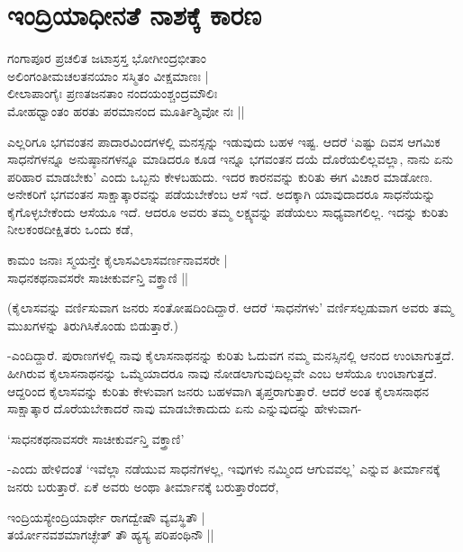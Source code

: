 \chapter{ಇಂದ್ರಿಯಾಧೀನತೆ ನಾಶಕ್ಕೆ ಕಾರಣ}\label{chap10}

\begin{shloka}
ಗಂಗಾಪೂರ ಪ್ರಚಲಿತ ಜಟಾಸ್ರಸ್ತ ಭೋಗೀಂದ್ರಭೀತಾಂ\\
ಅಲಿಂಗಂತೀಮಚಲತನಯಾಂ ಸಸ್ಮಿತಂ ವೀಕ್ಷಮಾಣಃ |\\
ಲೀಲಾಪಾಂಗೈಃ ಪ್ರಣತಜನತಾಂ ನಂದಯಂಶ್ಚಂದ್ರಮೌಲಿಃ\\
ಮೋಹಧ್ವಾಂತಂ ಹರತು ಪರಮಾನಂದ ಮೂರ್ತಿಶ್ಶಿವೋ ನಃ ||
\end{shloka}

ಎಲ್ಲರಿಗೂ ಭಗವಂತನ ಪಾದಾರವಿಂದಗಳಲ್ಲಿ ಮನಸ್ಸನ್ನು ಇಡುವುದು ಬಹಳ ಇಷ್ಟ. ಆದರೆ `ಎಷ್ಟು ದಿವಸ ಆಗಮಿಕ ಸಾಧನೆಗಳನ್ನೂ ಅನುಷ್ಠಾನಗಳನ್ನೂ ಮಾಡಿದರೂ ಕೂಡ ಇನ್ನೂ ಭಗವಂತನ ದಯೆ ದೊರೆಯಲಿಲ್ಲವಲ್ಲಾ, ನಾನು ಏನು ಪರಿಹಾರ ಮಾಡಬೇಕು' ಎಂದು ಒಬ್ಬನು ಕೇಳಬಹುದು. ಇದರ ಕಾರನವನ್ನು ಕುರಿತು ಈಗ ವಿಚಾರ ಮಾಡೋಣ. ಅನೇಕರಿಗೆ ಭಗವಂತನ ಸಾಕ್ಷಾತ್ಕಾರವನ್ನು ಪಡೆಯಬೇಕೆಂಬ ಆಸೆ ಇದೆ. ಅದಕ್ಕಾಗಿ ಯಾವುದಾದರೂ ಸಾಧನೆಯನ್ನು ಕೈಗೊಳ್ಳಬೇಕೆಂದು ಆಸೆಯೂ ಇದೆ. ಆದರೂ ಅವರು ತಮ್ಮ ಲಕ್ಷ್ಯವನ್ನು ಪಡೆಯಲು ಸಾಧ್ಯವಾಗಲಿಲ್ಲ. ಇದನ್ನು ಕುರಿತು ನೀಲಕಂಠದೀಕ್ಷಿತರು ಒಂದು ಕಡೆ,

\begin{shloka}
ಕಾಮಂ ಜನಾಃ ಸ್ಮಯನ್ತೇ ಕೈಲಾಸವಿಲಾಸವರ್ಣನಾವಸರೇ |\\
ಸಾಧನಕಥನಾವಸರೇ ಸಾಚೀಕುರ್ವನ್ತಿ ವಕ್ತ್ರಾಣಿ ||
\end{shloka}

(ಕೈಲಾಸವನ್ನು ವರ್ಣಿಸುವಾಗ ಜನರು ಸಂತೋಷದಿಂದಿದ್ದಾರೆ. ಆದರೆ `ಸಾಧನೆಗಳು' ವರ್ಣಿಸಲ್ಪಡುವಾಗ ಅವರು ತಮ್ಮ ಮುಖಗಳನ್ನು ತಿರುಗಿಸಿಕೊಂಡು ಬಿಡುತ್ತಾರೆ.)

-ಎಂದಿದ್ದಾರೆ. ಪುರಾಣಗಳಲ್ಲಿ ನಾವು ಕೈಲಾಸನಾಥನನ್ನು ಕುರಿತು ಓದುವಗ ನಮ್ಮ ಮನಸ್ಸಿನಲ್ಲಿ ಆನಂದ ಉಂಟಾಗುತ್ತದೆ. ಹೀಗಿರುವ ಕೈಲಾಸನಾಥನನ್ನು ಒಮ್ಮೆಯಾದರೂ ನಾವು ನೋಡಲಾಗುವುದಿಲ್ಲವೇ ಎಂಬ ಆಸೆಯೂ ಉಂಟಾಗುತ್ತದೆ. ಆದ್ದರಿಂದ ಕೈಲಾಸವನ್ನು ಕುರಿತು ಕೇಳುವಾಗ ಜನರು ಬಹಳವಾಗಿ ತೃಪ್ತರಾಗುತ್ತಾರೆ. ಆದರೆ ಅಂತ ಕೈಲಾಸನಾಥನ ಸಾಕ್ಷಾತ್ಕಾರ ದೊರೆಯಬೇಕಾದರೆ ನಾವು ಮಾಡಬೇಕಾದುದು ಏನು ಎನ್ನುವುದನ್ನು ಹೇಳುವಾಗ-

\begin{shloka}
`ಸಾಧನಕಥನಾವಸರೇ ಸಾಚೀಕುರ್ವನ್ತಿ ವಕ್ತ್ರಾಣಿ'
\end{shloka}

-ಎಂದು ಹೇಳಿದಂತೆ `ಇವೆಲ್ಲಾ ನಡೆಯುವ ಸಾಧನೆಗಳಲ್ಲ, ಇವುಗಳು ನಮ್ಮಿಂದ ಆಗುವವಲ್ಲ' ಎನ್ನುವ ತೀರ್ಮಾನಕ್ಕೆ ಜನರು ಬರುತ್ತಾರೆ. ಏಕೆ ಅವರು ಅಂಥಾ ತೀರ್ಮಾನಕ್ಕೆ ಬರುತ್ತಾರೆಂದರೆ,

\begin{shloka}
ಇಂದ್ರಿಯಸ್ಯೇಂದ್ರಿಯಾರ್ಥೇ ರಾಗದ್ವೇಷೌ ವ್ಯವಸ್ಥಿತೌ |\\
ತರ್ಯೋನವಶಮಾಗಚ್ಛೇತ್ ತೌ ಹ್ಯಸ್ಯ ಪರಿಪಂಥಿನೌ ||
\end{shloka}

